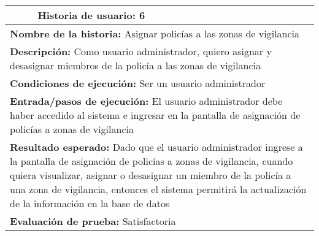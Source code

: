 \begin{longtable}{|p{6.7cm}|p{6.7cm}|}
    \hline
    \endlastfoot
    \multicolumn{1}{|p{6.7cm}|}{\textbf{Número} 6 } & \multicolumn{1}{|p{6.7cm}|}{\textbf{Historia de usuario:} 6}                                                                                                                                                                                                                                             \\
    \hline
    \multicolumn{2}{|p{13.4cm}|}{\textbf{Nombre de la historia:} Asignar policías a las zonas de vigilancia }                                                                                                                                                                                                                                                  \\
    \hline
    \multicolumn{2}{|p{13.4cm}|}{\textbf{Descripción:} Como usuario administrador, quiero asignar y desasignar miembros de la policía a las zonas de vigilancia}                                                                                                                                                                                               \\
    \hline
    \multicolumn{2}{|p{13.4cm}|}{\textbf{Condiciones de ejecución:} Ser un usuario administrador}                                                                                                                                                                                                                                                              \\
    \hline
    \multicolumn{2}{|p{13.4cm}|}{\textbf{Entrada/pasos de ejecución:} El usuario administrador debe haber accedido al sistema e ingresar en la pantalla de asignación de policías a zonas de vigilancia}                                                                                                                                                       \\
    \hline
    \multicolumn{2}{|p{13.4cm}|}{\textbf{Resultado esperado:} Dado que el usuario administrador ingrese a la pantalla de asignación de policías a zonas de vigilancia, cuando quiera visualizar, asignar o desasignar un miembro de la policía a una zona de vigilancia, entonces el sistema permitirá la actualización de la información en la base de datos} \\
    \hline
    \multicolumn{2}{|p{13.4cm}|}{\textbf{Evaluación de prueba:} Satisfactoria}                                                                                                                                                                                                                                                                                 \\
    \hline
\end{longtable}


